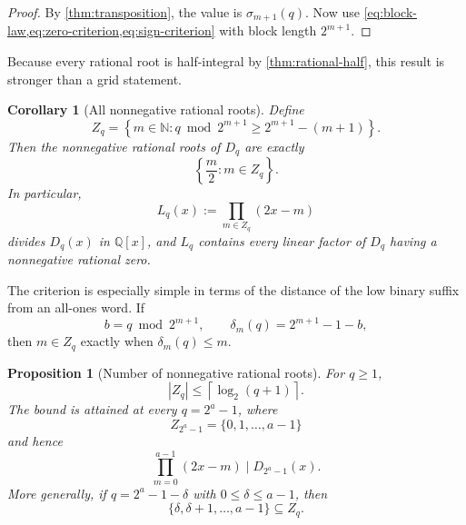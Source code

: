 \documentclass[11pt]{article}
\newtheorem{proposition}[theorem]{Proposition}
\newtheorem{corollary}[theorem]{Corollary}
\theoremstyle{definition}
\theoremstyle{remark}
\newcommand{\N}{\mathbb N}
\newcommand{\Q}{\mathbb Q}
\newcommand{\Diag}{D}
\begin{document}
\begin{proof}
By \cref{thm:transposition}, the value is \(\sigma_{m+1}(q)\).  Now use
\cref{eq:block-law,eq:zero-criterion,eq:sign-criterion} with block length
\(2^{m+1}\).
\end{proof}

Because every rational root is half-integral by
\cref{thm:rational-half}, this result is stronger than a grid statement.

\begin{corollary}[All nonnegative rational roots]\label{cor:all-nonneg-rational}
Define
\begin{equation}
 Z_q=\left\{m\in\N:
 q\bmod2^{m+1}\geq2^{m+1}-(m+1)\right\}.                  \label{eq:Zq}
\end{equation}
Then the nonnegative rational roots of \(\Diag_q\) are exactly
\begin{equation}
 \left\{\frac m2:m\in Z_q\right\}.                        \label{eq:nonneg-rational-roots}
\end{equation}
In particular,
\begin{equation}
 L_q(x):=\prod_{m\in Z_q}(2x-m)                            \label{eq:Lq}
\end{equation}
divides \(\Diag_q(x)\) in \(\Q[x]\), and \(L_q\) contains every linear
factor of \(\Diag_q\) having a nonnegative rational zero.
\end{corollary}

The criterion is especially simple in terms of the distance of the low
binary suffix from an all-ones word.  If
\[
 b=q\bmod2^{m+1},
 \qquad
 \delta_m(q)=2^{m+1}-1-b,
\]
then \(m\in Z_q\) exactly when \(\delta_m(q)\leq m\).

\begin{proposition}[Number of nonnegative rational roots]
For \(q\geq1\),
\begin{equation}
 |Z_q|\leq\left\lceil\log_2(q+1)\right\rceil.              \label{eq:root-count}
\end{equation}
The bound is attained at every \(q=2^a-1\), where
\begin{equation}
 Z_{2^a-1}=\{0,1,\ldots,a-1\}                              \label{eq:mersenne-roots}
\end{equation}
and hence
\begin{equation}
 \prod_{m=0}^{a-1}(2x-m)\mid\Diag_{2^a-1}(x).              \label{eq:mersenne-factor}
\end{equation}
More generally, if
\(q=2^a-1-\delta\) with \(0\leq\delta\leq a-1\), then
\begin{equation}
 \{\delta,\delta+1,\ldots,a-1\}\subseteq Z_q.             \label{eq:near-mersenne-chain}
\end{equation}
\end{proposition}
\end{document}

